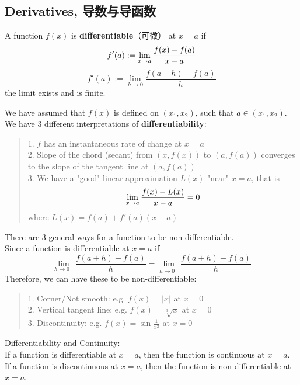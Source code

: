 \subsection{Derivatives, 导数与导函数}
\begin{definition}
    A function $f(x)$ is \textbf{differentiable}（可微） at $x = a$ if
    $$f'(a) := \lim_{x \to a} \frac{f(x) - f(a)}{x - a}$$
    $$f'(a) := \lim_{h \to 0} \frac{f(a + h) - f(a)}{h}$$
    the limit exists and is finite.
\end{definition}
We have assumed that $f(x)$ is defined on $(x_1, x_2)$, such that $a \in (x_1, x_2)$. \\
We have $3$ different interpretations of \textbf{differentiability}:
\begin{quote}
    1. $f$ has an instantaneous rate of change at $x = a$ \\
    2. Slope of the chord (secant) from $(x, f(x))$ to $(a, f(a))$ converges to the slope of the tangent line at $(a, f(a))$ \\
    3. We have a "good" linear approximation $L(x)$ "near" $x=a$, that is
    $$\lim_{x \to a} \frac{f(x) - L(x)}{x - a} = 0$$
    where $L(x) = f(a) + f'(a)(x-a)$
\end{quote}
There are $3$ general ways for a function to be non-differentiable. \\
Since a function is differentiable at $x = a$ if
$$\lim_{h \to 0^-} \frac{f(a + h)-f(a)}{h} = \lim_{h \to 0^+} \frac{f(a + h)-f(a)}{h}$$
Therefore, we can have these to be non-differentiable:
\begin{quote}
    1. Corner/Not smooth: e.g. $f(x)=|x|$ at $x=0$ \\
    2. Vertical tangent line: e.g. $f(x) = \sqrt[3]{x}$ at $x=0$ \\
    3. Discontinuity: e.g. $f(x) = \sin{\frac{1}{x^2}}$ at $x=0$
\end{quote}
\begin{theorem}
    Differentiability and Continuity: \\
    If a function is differentiable at $x=a$, then the function is continuous at $x=a$. \\
    If a function is discontinuous at $x=a$, then the function is non-differentiable at $x=a$.
\end{theorem}

